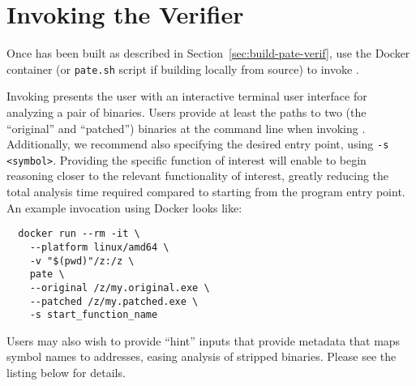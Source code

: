 
\section{Invoking the \pate{} Verifier}
\label{sec:run-pate-verif}

Once \pate{} has been built as described in Section~\ref{sec:build-pate-verif}, use the Docker container (or \texttt{pate.sh} script if building locally from source) to invoke \pate{}.

Invoking \pate{} presents the user with an interactive terminal user interface for analyzing a pair of binaries.
Users provide at least the paths to two (the ``original'' and ``patched'') binaries at the command line when invoking \pate{}.
Additionally, we recommend also specifying the desired entry point, using \texttt{-s <symbol>}.
Providing the specific function of interest will enable \pate{} to begin reasoning closer to the relevant functionality of interest, greatly reducing the total analysis time required compared to starting from the program entry point.
An example invocation using Docker looks like:

\begin{verbatim}
  docker run --rm -it \
    --platform linux/amd64 \
    -v "$(pwd)"/z:/z \
    pate \
    --original /z/my.original.exe \
    --patched /z/my.patched.exe \
    -s start_function_name
\end{verbatim}

Users may also wish to provide ``hint'' inputs that provide metadata that maps symbol names to addresses, easing analysis of stripped binaries.
Please see the listing below for details.

